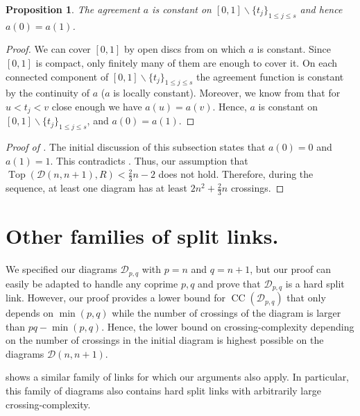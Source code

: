 \documentclass[10pt,a4paper]{amsart}
\newcommand{\addcross}{\operatorname{Top}}
\newcommand{\unlink}{\operatorname{CC}}
\newtheorem{proposition}[theorem]{Proposition}
\begin{document}
\begin{proposition}\label{prop_gen_orient_consistency}
The agreement $a$ is constant on $[0,1] \smallsetminus \{t_j\}_{1 \leq j\leq s}$ and hence $a(0)=a(1)$.
\end{proposition}

\begin{proof}
We can cover $[0,1]$ by open discs from  on which $a$ is constant. Since $[0,1]$ is compact, only finitely many of them are enough to cover it. On each connected component of $[0,1] \smallsetminus \{t_j\}_{1\leq j\leq s}$ the agreement function is constant by the continuity of $a$ ($a$ is locally constant). Moreover, we know from  that for $u < t_j < v$ close enough we have $a(u)=a(v)$. Hence, $a$ is constant on $[0,1] \smallsetminus \{t_j\}_{1 \leq j \leq s}$, and $a(0)=a(1)$. 
\end{proof}

\begin{proof}[Proof of ]
The initial discussion of this subsection states that $a(0) = 0$ and $a(1) = 1$. 
This contradicts . Thus, our assumption that $\addcross(\mathcal{D}(n,n+1), R)< \frac{2}{3}n-2$ does not hold. Therefore, during the sequence, at least one diagram has at least $2n^2 + \frac{2}{3}n$ crossings.
\end{proof} 



\section{Other families of split links.}\label{appendix_other}
We specified our diagrams $\mathcal{D}_{p,q}$ with $p = n$ and $q = n+1$, but our proof can easily be adapted to handle any coprime $p,q$ and prove that $\mathcal{D}_{p,q}$ is a hard split link. However, our proof provides a lower bound for $\unlink(\mathcal{D}_{p,q})$ that only depends on $\min (p,q)$ while the number of crossings of the diagram is larger than $pq - \min (p,q)$. Hence, the lower bound on crossing-complexity depending on the number of crossings in the initial diagram is highest possible on the diagrams $\mathcal{D}(n,n+1)$.


 shows a similar family of links for which our arguments also apply. In particular, this family of diagrams also contains hard split links with arbitrarily large crossing-complexity.
\end{document}
